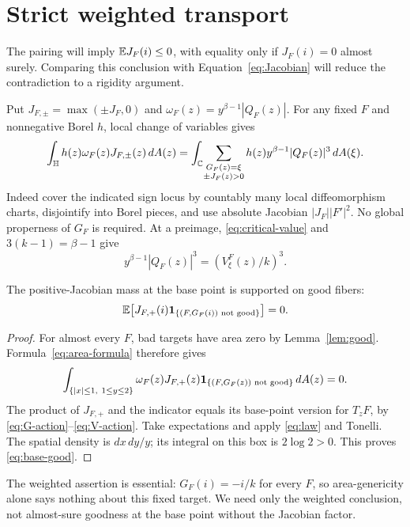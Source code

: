 \section{Strict weighted transport}\label{sec:transport}

The pairing will imply \(\mathbb E J_F(i)\le0\), with equality only if
\(J_F(i)=0\) almost surely. Comparing this conclusion with
Equation~\eqref{eq:Jacobian} will reduce the contradiction to a
rigidity argument.

Put \(J_{F,\pm}=\max(\pm J_F,0)\) and
\(\omega_F(z)=y^{\beta-1}|Q_F(z)|\).
For any fixed \(F\) and nonnegative Borel \(h\), local change of variables
gives
\begin{equation}\label{eq:area-formula}
 \int_\mathbb H h(z)\omega_F(z)J_{F,\pm}(z)\,dA(z)
 =
 \int_\mathbb C\!
 \sum_{\substack{G_F(z)=\xi\\ \pm J_F(z)>0}}
 h(z)y^{\beta-1}|Q_F(z)|^3\,dA(\xi).
\end{equation}
Indeed cover the indicated sign locus by countably many local
diffeomorphism charts, disjointify into Borel pieces, and use absolute
Jacobian \(|J_F||F'|^2\). No global properness of \(G_F\) is required.
At a preimage, \eqref{eq:critical-value} and \(3(k-1)=\beta-1\) give
\begin{equation}\label{eq:target-weight}
 y^{\beta-1}|Q_F(z)|^3=(V_\xi^F(z)/k)^3.
\end{equation}

\begin{lemma}\label{lem:base-good}
The positive-Jacobian mass at the base point is supported on good fibers:
\begin{equation}\label{eq:base-good}
 \mathbb E\bigl[J_{F,+}(i)
       \mathbf 1_{\{(F,G_F(i))\text{ not good}\}}\bigr]=0.
\end{equation}
\end{lemma}
\begin{proof}
For almost every \(F\), bad targets have area zero by
Lemma~\ref{lem:good}. Formula~\eqref{eq:area-formula} therefore gives
\[
 \int_{\{|x|\le1,\ 1\le y\le2\}}
 \omega_F(z)J_{F,+}(z)
 \mathbf 1_{\{(F,G_F(z))\text{ not good}\}}\,dA(z)=0.
\]
The product of \(J_{F,+}\) and the indicator equals its base-point
version for \(T_zF\), by \eqref{eq:G-action}--\eqref{eq:V-action}.
Take expectations and apply \eqref{eq:law} and Tonelli.
The spatial density is \(dx\,dy/y\); its integral on this box is
\(2\log2>0\). This proves \eqref{eq:base-good}.
\end{proof}

The weighted assertion is essential: \(G_F(i)=-i/k\) for every \(F\),
so area-genericity alone says nothing about this fixed target.
We need only the weighted conclusion, not almost-sure goodness
at the base point without the Jacobian factor.

